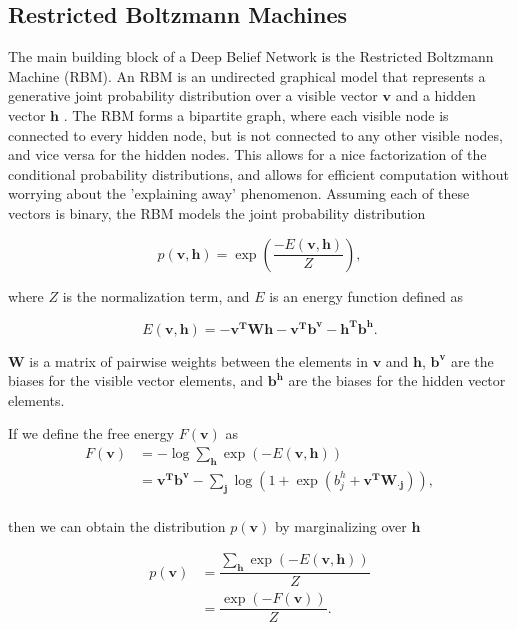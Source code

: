 \documentclass{article}
\begin{document}
\subsection{Restricted Boltzmann Machines}

The main building block of a Deep Belief Network is the Restricted Boltzmann
Machine (RBM). An RBM is an undirected graphical model that represents a
generative joint probability distribution over a visible vector $\mathbf{v}$
and a hidden vector $\mathbf{h}$ \cite{mnih2012conditional}. The RBM forms a
bipartite graph, where each visible node is connected to every hidden node, but
is not connected to any other visible nodes, and vice versa for the hidden
nodes.  This allows for a nice factorization of the conditional probability
distributions, and allows for efficient computation without worrying about the
'explaining away' phenomenon. Assuming each of these vectors is binary,
the RBM models the joint probability distribution

\[
  p \left( \mathbf{v}, \mathbf{h} \right) = 
  \exp \left(\dfrac{-E \left( \mathbf{v}, \mathbf{h} \right)}{Z}\right),
\]

where $Z$ is the normalization term, and $E$ is an energy function defined as

\[
  E \left( \mathbf{v}, \mathbf{h} \right) = 
  - \mathbf{v^TWh} - \mathbf{v^Tb^v} - \mathbf{h^Tb^h}.
\]

$\mathbf{W}$ is a matrix of pairwise weights between the elements in 
$\mathbf{v}$ and $\mathbf{h}$, $\mathbf{b^v}$ are the biases for the visible
vector elements, and $\mathbf{b^h}$ are the biases for the hidden vector
elements.

If we define the free energy $F(\mathbf{v})$ as
\begin{align*}
  F \left( \mathbf{v} \right) &= -\log \sum_{\mathbf{h}} \exp \left( -E \left( \mathbf{v,h} \right) \right) \\
  &= \mathbf{v^Tb^v} - \sum_{\mathbf{j}} \log
    \left(
      1 + \exp \left( b_j^h + \mathbf{v^TW_{\cdot j}} \right)
    \right), \\
\end{align*}

then we can obtain the distribution $p(\mathbf{v})$ by marginalizing over
$\mathbf{h}$

\begin{align*}
  p(\mathbf{v}) &= \dfrac{\sum_{\mathbf{h}} \exp(-E(\mathbf{v, h}))}{Z} \\
                &= \dfrac{\exp(-F(\mathbf{v}))}{Z}. \\
\end{align*}
\end{document}
